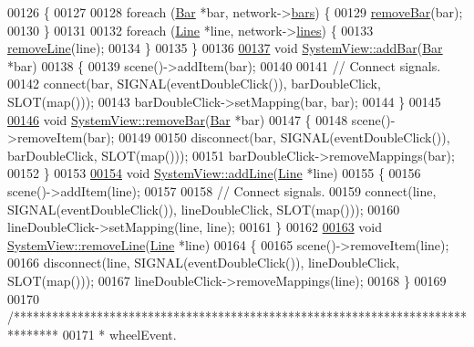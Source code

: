 \begin{DoxyCode}
00126 \{
00127 
00128   \textcolor{keywordflow}{foreach} (\hyperlink{class_bar}{Bar} *bar, network->\hyperlink{class_network_ae37a8418e42adf765b143cdc9d992b6c}{bars}) \{
00129     \hyperlink{group___graphics_ga1e96b08395a2f1b961dedbb3e8c99a50}{removeBar}(bar);
00130   \}
00131 
00132   \textcolor{keywordflow}{foreach} (\hyperlink{class_line}{Line} *line, network->\hyperlink{class_network_a49659f95d02baf087707c5a94fa23d90}{lines}) \{
00133     \hyperlink{group___graphics_ga4af1d763d9b9c02933e62d1f6231ad18}{removeLine}(line);
00134   \}
00135 \}
00136 
\hypertarget{systemview_8cpp_source_l00137}{}\hyperlink{group___graphics_gac4e02019d41c203c788ff1e6f3ee460e}{00137} \textcolor{keywordtype}{void} \hyperlink{group___graphics_gac4e02019d41c203c788ff1e6f3ee460e}{SystemView::addBar}(\hyperlink{class_bar}{Bar} *bar)
00138 \{
00139   scene()->addItem(bar);
00140 
00141   \textcolor{comment}{// Connect signals.}
00142   connect(bar, SIGNAL(eventDoubleClick()), barDoubleClick, SLOT(map()));
00143   barDoubleClick->setMapping(bar, bar);
00144 \}
00145 
\hypertarget{systemview_8cpp_source_l00146}{}\hyperlink{group___graphics_ga1e96b08395a2f1b961dedbb3e8c99a50}{00146} \textcolor{keywordtype}{void} \hyperlink{group___graphics_ga1e96b08395a2f1b961dedbb3e8c99a50}{SystemView::removeBar}(\hyperlink{class_bar}{Bar} *bar)
00147 \{
00148   scene()->removeItem(bar);
00149 
00150   disconnect(bar, SIGNAL(eventDoubleClick()), barDoubleClick, SLOT(map()));
00151   barDoubleClick->removeMappings(bar);
00152 \}
00153 
\hypertarget{systemview_8cpp_source_l00154}{}\hyperlink{group___graphics_gaed2fb15d518cab9a52ea1ee258846bfc}{00154} \textcolor{keywordtype}{void} \hyperlink{group___graphics_gaed2fb15d518cab9a52ea1ee258846bfc}{SystemView::addLine}(\hyperlink{class_line}{Line} *line)
00155 \{
00156   scene()->addItem(line);
00157 
00158   \textcolor{comment}{// Connect signals.}
00159   connect(line, SIGNAL(eventDoubleClick()), lineDoubleClick, SLOT(map()));
00160   lineDoubleClick->setMapping(line, line);
00161 \}
00162 
\hypertarget{systemview_8cpp_source_l00163}{}\hyperlink{group___graphics_ga4af1d763d9b9c02933e62d1f6231ad18}{00163} \textcolor{keywordtype}{void} \hyperlink{group___graphics_ga4af1d763d9b9c02933e62d1f6231ad18}{SystemView::removeLine}(\hyperlink{class_line}{Line} *line)
00164 \{
00165   scene()->removeItem(line);
00166   disconnect(line, SIGNAL(eventDoubleClick()), lineDoubleClick, SLOT(map()));
00167   lineDoubleClick->removeMappings(line);
00168 \}
00169 
00170 \textcolor{comment}{/*******************************************************************************}
00171 \textcolor{comment}{ * wheelEvent.}

\end{DoxyCode}
